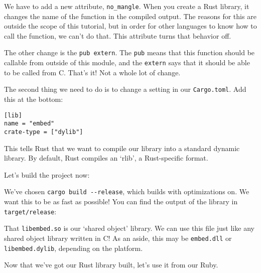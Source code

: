 \documentclass[a4paper,]{book}
\newenvironment{Shaded}{\begin{snugshade}}{\end{snugshade}}
\newcommand{\KeywordTok}[1]{\textcolor[rgb]{0.13,0.29,0.53}{\textbf{{#1}}}}
\newcommand{\NormalTok}[1]{{#1}}
\begin{document}
We have to add a new attribute, \texttt{no\_mangle}. When you create a
Rust library, it changes the name of the function in the compiled
output. The reasons for this are outside the scope of this tutorial, but
in order for other languages to know how to call the function, we can't
do that. This attribute turns that behavior off.

The other change is the \texttt{pub\ extern}. The \texttt{pub} means
that this function should be callable from outside of this module, and
the \texttt{extern} says that it should be able to be called from C.
That's it! Not a whole lot of change.

The second thing we need to do is to change a setting in our
\texttt{Cargo.toml}. Add this at the bottom:

\begin{verbatim}
[lib]
name = "embed"
crate-type = ["dylib"]
\end{verbatim}

This tells Rust that we want to compile our library into a standard
dynamic library. By default, Rust compiles an `rlib', a Rust-specific
format.

Let's build the project now:

\begin{Shaded}
\end{Shaded}

We've chosen \texttt{cargo\ build\ -\/-release}, which builds with
optimizations on. We want this to be as fast as possible! You can find
the output of the library in \texttt{target/release}:

\begin{Shaded}
\end{Shaded}

That \texttt{libembed.so} is our `shared object' library. We can use
this file just like any shared object library written in C! As an aside,
this may be \texttt{embed.dll} or \texttt{libembed.dylib}, depending on
the platform.

Now that we've got our Rust library built, let's use it from our Ruby.
\end{document}

